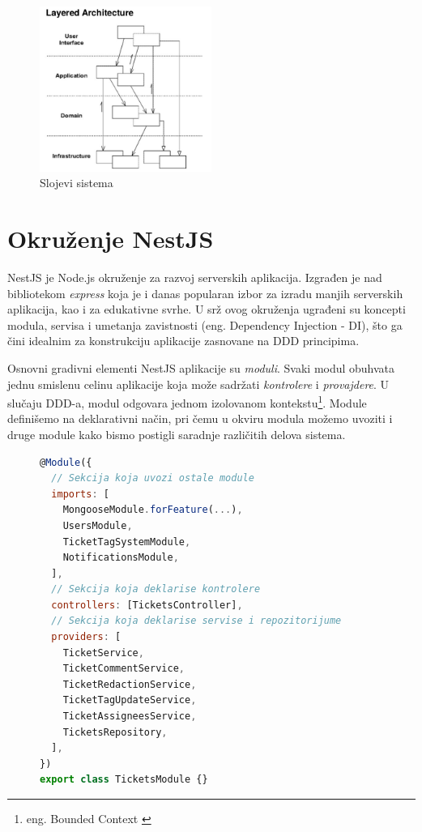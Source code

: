 \documentclass[12pt,oneside]{memoir}
\begin{document}
\begin{figure}[h]
  \centering
  \includegraphics[width=0.5\textwidth]{docs/images/ch_2/DDD-Layered-Architecture-2.png} 
  \caption{Slojevi sistema \cite{dddfull}}
  \label{fig:sample}
\end{figure}

\section{Okruženje NestJS}

NestJS \cite{nestjsdocs} je Node.js okruženje za razvoj serverskih aplikacija. Izgrađen je nad bibliotekom \textit{express} \cite{expressjsdocs} koja je i danas popularan izbor za izradu manjih serverskih aplikacija, kao i za edukativne svrhe.  U srž ovog okruženja ugrađeni su koncepti modula, servisa i umetanja zavistnosti (eng. Dependency Injection - DI), što ga čini idealnim za konstrukciju aplikacije zasnovane na DDD principima.

Osnovni gradivni elementi NestJS aplikacije su \textit{moduli}. Svaki modul obuhvata jednu smislenu celinu aplikacije koja može sadržati \textit{kontrolere} i \textit{provajdere}. U slučaju DDD-a, modul odgovara jednom izolovanom kontekstu\footnote{eng. Bounded Context \cite{dddfull}}. Module definišemo na deklarativni način, pri čemu u okviru modula možemo uvoziti i druge module kako bismo postigli saradnje različitih delova sistema.

\begin{figure}[h]
\begin{lstlisting}[language=JavaScript, style=ES6, caption={fajl tickets.module.ts}]
@Module({
  // Sekcija koja uvozi ostale module
  imports: [
    MongooseModule.forFeature(...),
    UsersModule,
    TicketTagSystemModule,
    NotificationsModule,
  ],
  // Sekcija koja deklarise kontrolere
  controllers: [TicketsController],
  // Sekcija koja deklarise servise i repozitorijume
  providers: [
    TicketService,
    TicketCommentService,
    TicketRedactionService,
    TicketTagUpdateService,
    TicketAssigneesService,
    TicketsRepository,
  ],
})
export class TicketsModule {}
\end{lstlisting}
\end{figure}
\end{document}

